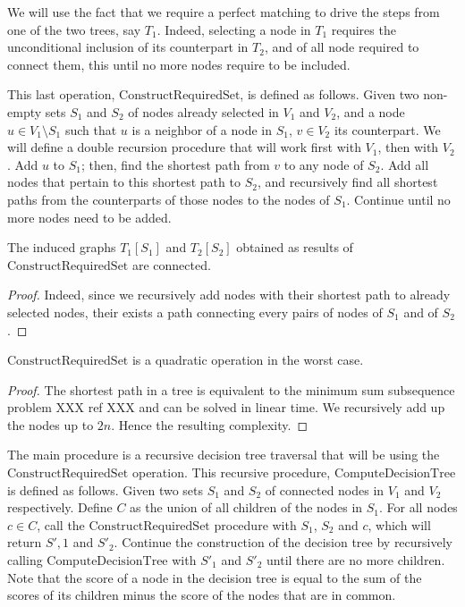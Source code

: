 			We will use the fact that we require a perfect matching to drive the steps from one of the two trees, say $T_1$.
			Indeed, selecting a node in $T_1$ requires the unconditional inclusion of its counterpart in $T_2$, and of all node required to connect them, this until no more nodes require to be included.

			This last operation, $\text{ConstructRequiredSet}$, is defined as follows.
			Given two non-empty sets $S_1$ and $S_2$ of nodes already selected in $V_1$ and $V_2$, and a node $u \in V_1 \setminus S_1$ such that $u$ is a neighbor of a node in $S_1$, $v \in V_2$ its counterpart.
			We will define a double recursion procedure that will work first with $V_1$, then with $V_2$.
			Add $u$ to $S_1$; then, find the shortest path from $v$ to any node of $S_2$.
			Add all nodes that pertain to this shortest path to $S_2$, and recursively find all shortest paths from the counterparts of those nodes to the nodes of $S_1$.
			Continue until no more nodes need to be added.

			\begin{proposition}\label{sec:apx-bt-cater-proof}
				The induced graphs $T_1[S_1]$ and $T_2[S_2]$ obtained as results of $\text{ConstructRequiredSet}$ are connected.
			\end{proposition}
			\begin{proof}
				Indeed, since we recursively add nodes with their shortest path to already selected nodes, their exists a path connecting every pairs of nodes of $S_1$ and of $S_2$.
			\end{proof}

			\begin{proposition}\label{sec:apx-ater-proof}
				$\text{ConstructRequiredSet}$ is a quadratic operation in the worst case.
			\end{proposition}
			\begin{proof}
				The shortest path in a tree is equivalent to the minimum sum subsequence problem XXX ref XXX and can be solved in linear time.
				We recursively add up the nodes up to $2n$.
				Hence the resulting complexity.
			\end{proof}

			The main procedure is a recursive decision tree traversal that will be using the $\text{ConstructRequiredSet}$ operation.
			This recursive procedure, $\text{ComputeDecisionTree}$ is defined as follows.
			Given two sets $S_1$ and $S_2$ of connected nodes in $V_1$ and $V_2$ respectively.
			Define $C$ as the union of all children of the nodes in $S_1$.
			For all nodes $c \in C$, call the $\text{ConstructRequiredSet}$ procedure with $S_1$, $S_2$ and $c$, which will return $S',1$ and $S'_2$.
			Continue the construction of the decision tree by recursively calling $\text{ComputeDecisionTree}$ with $S'_1$ and $S'_2$ until there are no more children.
			Note that the score of a node in the decision tree is equal to the sum of the scores of its children minus the score of the nodes that are in common.

